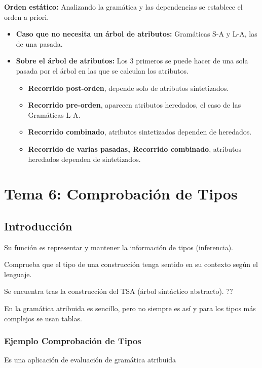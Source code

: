 \documentclass[12pt, twoside, openright]{report} %
\begin{document}
\textbf{Orden estático:} Analizando la gramática y las dependencias se establece el orden a priori.
  \begin{itemize}
    \item \textbf{Caso que no necesita un árbol de atributos:} Gramáticas S-A y L-A, las de una pasada.
    \item \textbf{Sobre el árbol de atributos:} Los 3 primeros se puede hacer de una sola pasada por el árbol en las que se calculan los atributos.
    \begin{itemize}
      \item \textbf{Recorrido post-orden}, depende solo de atributos sintetizados.    
      \item \textbf{Recorrido pre-orden}, aparecen atributos heredados, el caso de las Gramáticas L-A.
      \item \textbf{Recorrido combinado}, atributos sintetizados dependen de heredados.
      \item \textbf{Recorrido de varias pasadas, Recorrido combinado}, atributos heredados dependen de sintetizados.
    \end{itemize}
  \end{itemize}

\begin{figure}[H]
	{\centering 
    \def\svgwidth{1.1\textwidth}
    }
\end{figure}

\chapter{Tema 6: Comprobación de Tipos}
\section{Introducción}
Su función es representar y mantener la información de tipos (inferencia).

Comprueba que el tipo de una construcción tenga sentido en su contexto según el lenguaje.

Se encuentra tras la construcción del TSA (árbol sintáctico abstracto). ??

En la gramática atribuida es sencillo, pero no siempre es así y para los tipos más complejos se usan tablas.

\subsection{Ejemplo Comprobación de Tipos}
Es una aplicación de evaluación de gramática atribuida
\end{document}
